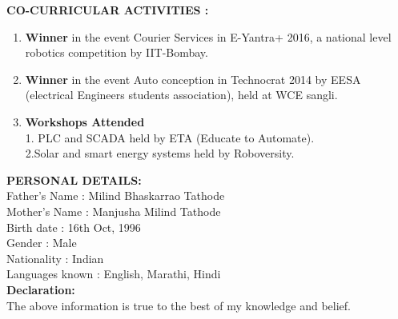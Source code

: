 \documentclass[12pt]{article}
\begin{document}
\begin{flushleft}
\begin{flushleft}
\begin{flushleft}
\begin{itemize}
\end{itemize}
\end{flushleft}
\textbf{CO-CURRICULAR ACTIVITIES : }
\begin{enumerate}
\item \textbf{Winner} in the event Courier Services in E-Yantra+ 2016, a national level robotics competition by IIT-Bombay.
\item \textbf{Winner} in the event Auto conception in Technocrat 2014 by EESA (electrical Engineers students association), held at WCE sangli.
\item \textbf{Workshops Attended}\\ 1. PLC and SCADA held by ETA (Educate to Automate).\\
2.Solar and smart energy systems held by Roboversity.
\end{enumerate}
\textbf{PERSONAL DETAILS:}\\
\vspace{2ex}
Father's Name : Milind Bhaskarrao Tathode\\
Mother's Name : Manjusha Milind Tathode\\
Birth date : 16th Oct, 1996\\
Gender : Male\\
Nationality : Indian\\
Languages known : English, Marathi, Hindi\\
\vspace{5ex}
\textbf{Declaration:}\\The above information is true to the best of my knowledge and belief.\\
\vspace{5ex}
\end{document}
